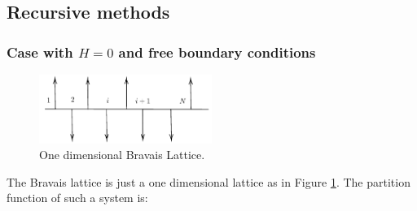 \documentclass[../main/main.tex]{subfiles}
\begin{document}
\subsection{Recursive methods}

\subsubsection{Case with \( H=0 \) and free boundary conditions}

\begin{figure}[h!]
\centering
\includegraphics[width=0.5\textwidth]{../lessons/6_image/2.pdf}
\caption{\label{fig:6_2} One dimensional Bravais Lattice.}
\end{figure}

The Bravais lattice is just a one dimensional lattice as in Figure \ref{fig:6_2}. The partition function of such a system is:
\end{document}

